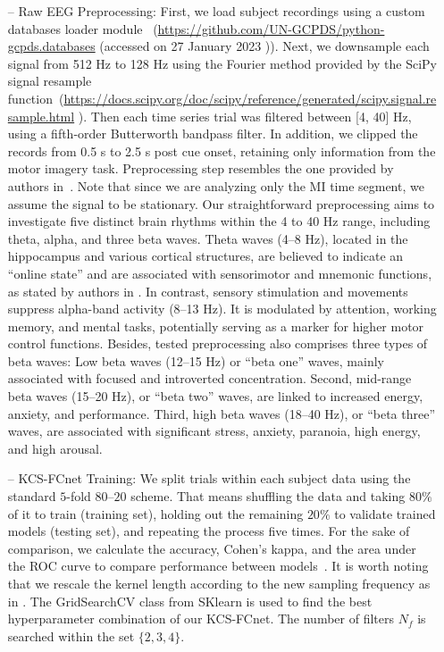\begin{itemize}
    \item[--] {{Raw EEG Preprocessing:} 
    } First, we load subject recordings using a custom databases loader {module} 
    ~(\url{https://github.com/UN-GCPDS/python-gcpds.databases} ({accessed on 27 January 2023}
    )). Next, we downsample each signal from 512 Hz to 128 Hz using the Fourier method provided by the SciPy signal resample function~(\url{https://docs.scipy.org/doc/scipy/reference/generated/scipy.signal.resample.html} ). Then each time series trial was filtered between [4, 40] Hz, using a fifth-order Butterworth bandpass filter. In addition, we clipped the records from 0.5 s to 2.5 s post cue onset, retaining only information from the motor imagery task. Preprocessing step resembles the one provided by authors in~\cite{lawhern2018eegnet}. Note that since we are analyzing only the MI time segment, we assume the signal to be stationary. Our straightforward preprocessing aims to investigate five distinct brain rhythms within the 4 to 40 Hz range, including theta, alpha, and three beta waves. Theta waves (4--8 Hz), located in the hippocampus and various cortical structures, are believed to indicate an ``online state'' and are associated with sensorimotor and mnemonic functions, as stated by authors in \cite{ABHANG201651}. In contrast, sensory stimulation and movements suppress alpha-band activity (8--13 Hz). It is modulated by attention, working memory, and mental tasks, potentially serving as a marker for higher motor control functions. Besides, tested preprocessing also comprises three types of beta waves: Low beta waves (12--15 Hz) or ``beta one'' waves, mainly associated with focused and introverted concentration. Second, mid-range beta waves (15--20 Hz), or ``beta two'' waves, are linked to increased energy, anxiety, and performance. Third, high beta waves (18--40 Hz), or ``beta three'' waves, are associated with significant stress, anxiety, paranoia, high energy, and high arousal.
    
    \item[--] {{KCS-FCnet Training:}} We split trials within each subject data using the standard $5$-{fold} $80${--}$20$ scheme. That means shuffling the data and taking $80\%$ of it to train (training set), holding out the remaining $20\%$ to validate trained models (testing set), and repeating the process five times. For the sake of comparison, we calculate the accuracy, Cohen's kappa, and the area under the ROC curve to compare performance between models~\cite{warrens2015five,geron2022hands}. It is worth noting that we rescale the kernel length according to the new sampling frequency as in \cite{lawhern2018eegnet}. The GridSearchCV class from SKlearn is used to find the best hyperparameter combination of our KCS-FCnet. The number of filters $N_f$ is searched within the set $\{2,3,4\}$.
    

\end{itemize}

